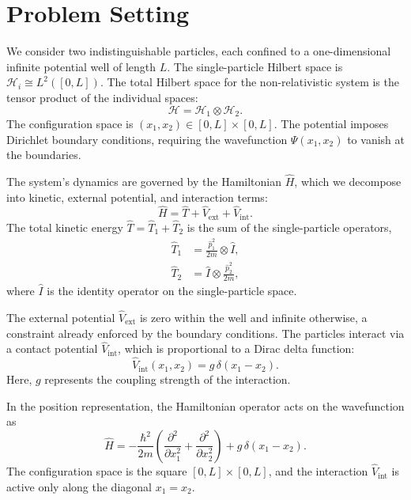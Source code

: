 \section{Problem Setting} \label{sec:problem}

We consider two indistinguishable particles, each confined to a
one-dimensional infinite potential well of length $L$.
The single-particle Hilbert space is $\mathcal{H}_i \cong L^2([0, L])$.
The total Hilbert space for the non-relativistic system is the tensor
product of the individual spaces:
\begin{equation}
	\mathcal{H} = \mathcal{H}_1 \otimes \mathcal{H}_2.
\end{equation}
The configuration space is $(x_1, x_2) \in [0, L] \times [0, L]$.
The potential imposes Dirichlet boundary conditions,
requiring the wavefunction $\Psi(x_1, x_2)$ to vanish at the boundaries.

The system's dynamics are governed by the Hamiltonian $\hat{H}$,
which we decompose into kinetic, external potential, and interaction terms:
\begin{equation}
	\hat{H} = \hat{T} + \hat{V}_{\text{ext}} + \hat{V}_{\text{int}}.
\end{equation}
The total kinetic energy $\hat{T} = \hat{T}_1 + \hat{T}_2$ is the sum
of the single-particle operators,
\begin{align}
	\hat{T}_1 &= \frac{\hat{p}_1^2}{2m} \otimes \hat{I}, \\
	\hat{T}_2 &= \hat{I} \otimes \frac{\hat{p}_2^2}{2m},
\end{align}
where $\hat{I}$ is the identity operator on the single-particle space.

The external potential $\hat{V}_{\text{ext}}$ is zero within the well and
infinite otherwise, a constraint already enforced by the boundary
conditions. The particles interact via a contact potential
$\hat{V}_{\text{int}}$, which is proportional to a Dirac delta function:
\begin{equation}
	\hat{V}_{\text{int}}(x_1, x_2) = g\,\delta(x_1 - x_2).
\end{equation}
Here, $g$ represents the coupling strength of the interaction.

In the position representation, the Hamiltonian operator acts on
the wavefunction as
\begin{equation} \label{eq:hamiltonian}
	\hat{H} = -\frac{\hbar^2}{2m}\left(\frac{\partial^2}{\partial x_1^2} +
	\frac{\partial^2}{\partial x_2^2}\right) + g\,\delta(x_1 - x_2).
\end{equation}
The configuration space is the square $[0, L] \times [0, L]$,
and the interaction $\hat{V}_{\text{int}}$ is active only along
the diagonal $x_1 = x_2$.

